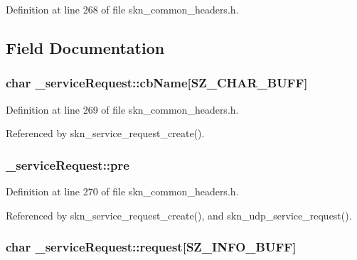 Definition at line 268 of file skn\+\_\+common\+\_\+headers.\+h.



\subsection{Field Documentation}
\hypertarget{struct__service_request_aab7831722782ba05f0c94087598a941e}{
\subsubsection[{cb\+Name}]{\setlength{\rightskip}{0pt plus 5cm}char \+\_\+service\+Request\+::cb\+Name\mbox{[}{\bf S\+Z\+\_\+\+C\+H\+A\+R\+\_\+\+B\+U\+F\+F}\mbox{]}}}\label{struct__service_request_aab7831722782ba05f0c94087598a941e}


Definition at line 269 of file skn\+\_\+common\+\_\+headers.\+h.



Referenced by skn\+\_\+service\+\_\+request\+\_\+create().

\hypertarget{struct__service_request_acf8d45e7f9cb65b555217aae74cd72c5}{
\subsubsection[{pre}]{ \+\_\+service\+Request\+::pre}}\label{struct__service_request_acf8d45e7f9cb65b555217aae74cd72c5}


Definition at line 270 of file skn\+\_\+common\+\_\+headers.\+h.



Referenced by skn\+\_\+service\+\_\+request\+\_\+create(), and skn\+\_\+udp\+\_\+service\+\_\+request().

\hypertarget{struct__service_request_ad347b2a07388ec9d9d33756f1a1ef235}{
\subsubsection[{request}]{\setlength{\rightskip}{0pt plus 5cm}char \+\_\+service\+Request\+::request\mbox{[}{\bf S\+Z\+\_\+\+I\+N\+F\+O\+\_\+\+B\+U\+F\+F}\mbox{]}}}\label{struct__service_request_ad347b2a07388ec9d9d33756f1a1ef235}


